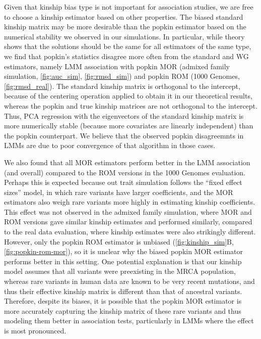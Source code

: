 \documentclass[11pt]{article}
\begin{document}
Given that kinship bias type is not important for association studies, we are free to choose a kinship estimator based on other properties.
The biased standard kinship matrix may be more desirable than the popkin estimator based on the numerical stability we observed in our simulations.
In particular, while theory shows that the solutions should be the same for all estimators of the same type, we find that popkin's statistics disagree more often from the standard and WG estimators, namely LMM association with popkin MOR (admixed family simulation, \cref{fig:auc_sim}, \cref{fig:rmsd_sim}) and popkin ROM (1000 Genomes, \cref{fig:rmsd_real}).
The standard kinship matrix is orthogonal to the intercept, because of the centering operation applied to obtain it in our theoretical results, whereas the popkin and true kinship matrices are not orthogonal to the intercept.
Thus, PCA regression with the eigenvectors of the standard kinship matrix is more numerically stable (because more covariates are linearly independent) than the popkin counterpart.
We believe that the observed popkin disagreemnts in LMMs are due to poor convergence of that algorithm in those cases.

We also found that all MOR estimators perform better in the LMM association (and overall) compared to the ROM versions in the 1000 Genomes evaluation.
Perhaps this is expected because out trait simulation follows the ``fixed effect sizes'' model, in which rare variants have larger coefficients, and the MOR estimators also weigh rare variants more highly in estimating kinship coefficients.
This effect was not observed in the admixed family simulation, where MOR and ROM versions gave similar kinship estimates and performed similarly, compared to the real data evaluation, where kinship estimates were also strikingly different.
However, only the popkin ROM estimator is unbiased (\cref{fig:kinship_sim}B, \cref{fig:popkin-rom-mor}), so it is unclear why the biased popkin MOR estimator performs better in this setting.
One potential explanation is that our kinship model assumes that all variants were preexisting in the MRCA population, whereas rare variants in human data are known to be very recent mutations, and thus their effective kinship matrix is different than that of ancestral variants.
Therefore, despite its biases, it is possible that the popkin MOR estimator is more accurately capturing the kinship matrix of these rare variants and thus modeling them better in association tests, particularly in LMMs where the effect is most pronounced.
\end{document}
